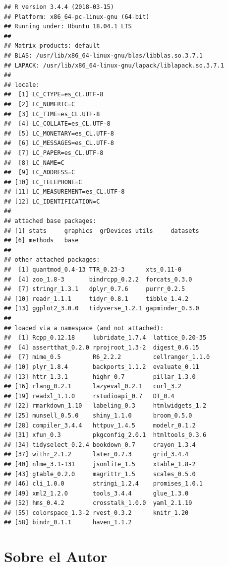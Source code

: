 \documentclass[12pt,]{book}
\begin{document}
\begin{verbatim}
## R version 3.4.4 (2018-03-15)
## Platform: x86_64-pc-linux-gnu (64-bit)
## Running under: Ubuntu 18.04.1 LTS
## 
## Matrix products: default
## BLAS: /usr/lib/x86_64-linux-gnu/blas/libblas.so.3.7.1
## LAPACK: /usr/lib/x86_64-linux-gnu/lapack/liblapack.so.3.7.1
## 
## locale:
##  [1] LC_CTYPE=es_CL.UTF-8      
##  [2] LC_NUMERIC=C              
##  [3] LC_TIME=es_CL.UTF-8       
##  [4] LC_COLLATE=es_CL.UTF-8    
##  [5] LC_MONETARY=es_CL.UTF-8   
##  [6] LC_MESSAGES=es_CL.UTF-8   
##  [7] LC_PAPER=es_CL.UTF-8      
##  [8] LC_NAME=C                 
##  [9] LC_ADDRESS=C              
## [10] LC_TELEPHONE=C            
## [11] LC_MEASUREMENT=es_CL.UTF-8
## [12] LC_IDENTIFICATION=C       
## 
## attached base packages:
## [1] stats     graphics  grDevices utils     datasets 
## [6] methods   base     
## 
## other attached packages:
##  [1] quantmod_0.4-13 TTR_0.23-3      xts_0.11-0     
##  [4] zoo_1.8-3       bindrcpp_0.2.2  forcats_0.3.0  
##  [7] stringr_1.3.1   dplyr_0.7.6     purrr_0.2.5    
## [10] readr_1.1.1     tidyr_0.8.1     tibble_1.4.2   
## [13] ggplot2_3.0.0   tidyverse_1.2.1 gapminder_0.3.0
## 
## loaded via a namespace (and not attached):
##  [1] Rcpp_0.12.18     lubridate_1.7.4  lattice_0.20-35 
##  [4] assertthat_0.2.0 rprojroot_1.3-2  digest_0.6.15   
##  [7] mime_0.5         R6_2.2.2         cellranger_1.1.0
## [10] plyr_1.8.4       backports_1.1.2  evaluate_0.11   
## [13] httr_1.3.1       highr_0.7        pillar_1.3.0    
## [16] rlang_0.2.1      lazyeval_0.2.1   curl_3.2        
## [19] readxl_1.1.0     rstudioapi_0.7   DT_0.4          
## [22] rmarkdown_1.10   labeling_0.3     htmlwidgets_1.2 
## [25] munsell_0.5.0    shiny_1.1.0      broom_0.5.0     
## [28] compiler_3.4.4   httpuv_1.4.5     modelr_0.1.2    
## [31] xfun_0.3         pkgconfig_2.0.1  htmltools_0.3.6 
## [34] tidyselect_0.2.4 bookdown_0.7     crayon_1.3.4    
## [37] withr_2.1.2      later_0.7.3      grid_3.4.4      
## [40] nlme_3.1-131     jsonlite_1.5     xtable_1.8-2    
## [43] gtable_0.2.0     magrittr_1.5     scales_0.5.0    
## [46] cli_1.0.0        stringi_1.2.4    promises_1.0.1  
## [49] xml2_1.2.0       tools_3.4.4      glue_1.3.0      
## [52] hms_0.4.2        crosstalk_1.0.0  yaml_2.1.19     
## [55] colorspace_1.3-2 rvest_0.3.2      knitr_1.20      
## [58] bindr_0.1.1      haven_1.1.2
\end{verbatim}

\chapter*{Sobre el Autor}\label{sobre-el-autor}
\end{document}

